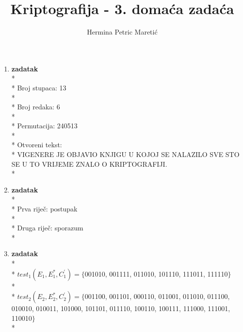 \documentclass[11pt]{article} %
\title{Kriptografija - 3. domaća zadaća}
\author{Hermina Petric Maretić}
\begin{document}
\maketitle

\begin{enumerate}
\item \textbf{zadatak}
\\*
\\*
Broj stupaca: 13
\\*
\\*
Broj redaka: 6
\\*
\\*
Permutacija: 240513
\\*
\\*
Otvoreni tekst: 
\\*
VIGENERE JE OBJAVIO KNJIGU U KOJOJ SE NALAZILO SVE STO SE U TO VRIJEME ZNALO O KRIPTOGRAFIJI.
\\*
\item \textbf{zadatak}
\\*
\\*
Prva riječ: postupak
\\*
\\*
Druga riječ: sporazum
\\*
\item \textbf{zadatak}
\\*
\\*
$ test_{1} (E_{1}, E_{1}^{*}, C_{1}^{'}) = \lbrace $001010, 001111, 011010, 101110, 111011, 111110$ \rbrace $
\\*
\\*
$ test_{2} (E_{2}, E_{2}^{*}, C_{2}^{'}) = \lbrace $001100, 001101, 000110, 011001, 011010, 011100, 010010, 010011, 101000, 101101, 011110, 100110, 100111, 111000, 111001, 110010$ \rbrace$
\\*

\end{enumerate}
\end{document}
